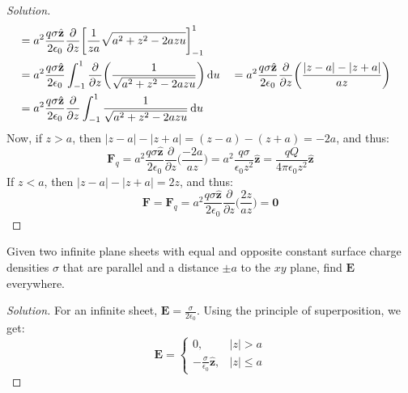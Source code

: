 \begin{proof}[Solution]
\begin{align*}
                    &=a^{2}\frac{q\sigma \hat{\mathbf{z}}}{2\epsilon_{0}}
                    \frac{\partial}{\partial z}
                    \bigg[\frac{1}{za}\sqrt{a^{2}+z^{2}-2azu}\bigg]_{-1}^{1}\\
                    &=a^{2}\frac{q\sigma\hat{\mathbf{z}}}{2\epsilon_{0}}
                    \int_{-1}^{1}\frac{\partial}{\partial{z}}
                    \bigg(\frac{1}{\sqrt{a^{2}+z^{2}-2azu}}\bigg)\mathop{}\!\mathrm{d}{u}
                    &
                    &=a^{2}\frac{q\sigma\hat{\mathbf{z}}}{2\epsilon_{0}}
                    \frac{\partial}{\partial{z}}
                    \bigg(\frac{|z-a|-|z+a|}{az}\bigg)\\
                    &=a^{2}\frac{q\sigma \hat{\mathbf{z}}}{2\epsilon_{0}}
                    \frac{\partial}{\partial{z}}
                    \int_{-1}^{1}\frac{1}{\sqrt{a^{2}+z^{2}-2azu}}\mathop{}\!\mathrm{d}{u}\\
                \end{align*}
                Now, if $z>a$, then $|z-a|-|z+a|=(z-a)-(z+a)=-2a$, and thus:
                \begin{equation*}
                    \mathbf{F}_{q}
                    =a^{2}\frac{q\sigma\hat{\mathbf{z}}}{2\epsilon_{0}}
                    \frac{\partial}{\partial{z}}\bigg(\frac{-2a}{az}\bigg)
                    =a^{2}\frac{q\sigma}{\epsilon_{0}z^{2}}\hat{\mathbf{z}}
                    =\frac{qQ}{4\pi\epsilon_{0}z^{2}}\hat{\mathbf{z}}\tag{$z>a$}
                \end{equation*}
                If $z<a$, then $|z-a|-|z+a|=2z$, and thus:
                \begin{equation*}
                    \mathbf{F}=\mathbf{F}_{q}=a^{2}\frac{q\sigma
                    \hat{\mathbf{z}}}{2\epsilon_{0}}
                    \frac{\partial}{\partial z}\bigg(\frac{2z}{az}\bigg)
                    =\mathbf{0}\tag{$z<a$}
                \end{equation*}
            \end{proof}
            \begin{problem}[Wangsness 3-9]
                Given two infinite plane sheets with equal and opposite
                constant surface charge densities $\sigma$ that are
                parallel and a distance $\pm a$ to the $xy$ plane,
                find $\mathbf{E}$ everywhere.
            \end{problem}
            \begin{proof}[Solution]
                For an infinite sheet,
                $\mathbf{E}=\frac{\sigma}{2\epsilon_{0}}$.
                Using the principle of superposition, we get:
                \begin{equation*}
                    \mathbf{E}=
                    \begin{cases}
                        0,
                        &|z|>a\\
                        -\frac{\sigma}
                              {\epsilon_{0}}\hat{\mathbf{z}},
                        &|z|\leq{a}
                    \end{cases}
                \end{equation*}
            \end{proof}
